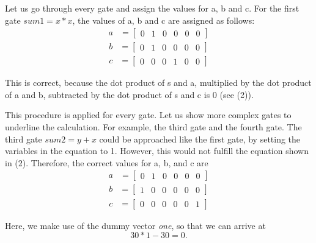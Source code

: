 Let us go through every gate and assign the values for a, b and c.
For the first gate \(sum1 = x*x\), the values of a, b and c are assigned as follows:
\begin{align*}
    a &=\begin{bmatrix}
        0 & 1 & 0 & 0 & 0 & 0
    \end{bmatrix}
\end{align*}
\begin{align*}
    b&=\begin{bmatrix}
        0 & 1 & 0 & 0 & 0 & 0 
    \end{bmatrix}
\end{align*}
\begin{align*}
    c&=\begin{bmatrix}
        0 & 0 & 0 & 1 & 0 & 0
    \end{bmatrix}
\end{align*}

This is correct, because the dot product of s and a, multiplied by the dot product of a and b, subtracted by the dot product of s and c is 0 (see (2)).

This procedure is applied for every gate. Let us show more complex gates to underline the calculation. For example, the third gate and the fourth gate. The third gate \(sum2=y+x\) could be approached like the first gate, by setting the variables in the equation to 1. However, this would not fulfill the equation shown in (2). Therefore, the correct values for a, b, and c are
\begin{align*}
    a &=\begin{bmatrix}
        0 & 1 & 0 & 0 & 0 & 0
    \end{bmatrix}
\end{align*}
\begin{align*}
    b&=\begin{bmatrix}
        1 & 0 & 0 & 0 & 0 & 0 
    \end{bmatrix}
\end{align*}
\begin{align*}
    c&=\begin{bmatrix}
        0 & 0 & 0 & 0 & 0 & 1
    \end{bmatrix}
\end{align*}

Here, we make use of the dummy vector \textit{one}, so that we can arrive at 
\[30 * 1 - 30 = 0.\]

